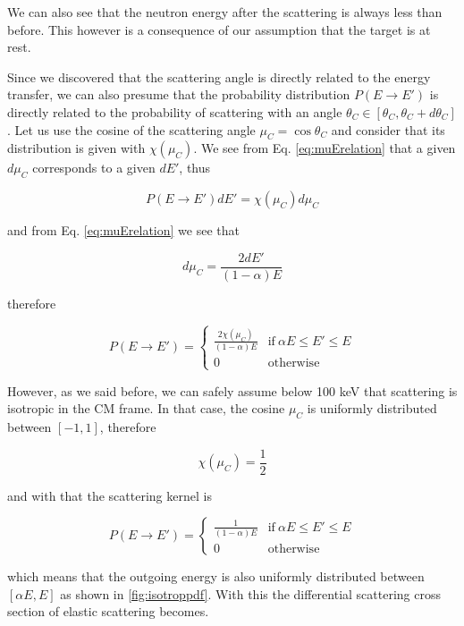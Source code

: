 We can also see that the neutron energy after the scattering is always less than before. This however is a consequence of our assumption that the target is at rest.

Since we discovered that the scattering angle is directly related to the energy transfer, we can also presume that the probability distribution $P(E\rightarrow E')$ is directly related to the probability of scattering with an angle $\theta_C \in [\theta_C,\theta_C+d\theta_C]$. Let us use the cosine of the scattering angle $\mu_C=\cos\theta_C$ and consider that its distribution is given with $\chi(\mu_C)$. We see from Eq. \eqref{eq:muErelation} that a given $d\mu_C$ corresponds to a given $dE'$, thus 

$$P(E\rightarrow E')dE'=\chi(\mu_C)d\mu_C$$

\noindent and from  Eq. \eqref{eq:muErelation} we see that

$$d\mu_C=\frac{2dE'}{(1-\alpha)E}$$

\noindent therefore

\begin{equation}
    P(E\rightarrow E') = 
    \begin{cases}
      \frac{2\chi(\mu_C)}{(1-\alpha)E} & \text{if} \: \alpha E \leq E' \leq E \\
      0 & \text{otherwise}
    \end{cases}
\end{equation}

However, as we said before, we can safely assume below 100 keV that scattering is isotropic in the CM frame. In that case, the cosine $\mu_C$ is uniformly distributed between $[-1,1]$, therefore

$$\chi(\mu_C)=\frac{1}{2}$$

\noindent and with that the scattering kernel is

\begin{equation}
    P(E\rightarrow E') = 
    \begin{cases}
      \frac{1}{(1-\alpha)E} & \text{if} \: \alpha E \leq E' \leq E \\
      0 & \text{otherwise}
    \end{cases}
\end{equation}

\noindent which means that the outgoing energy is also uniformly distributed between $[\alpha E, E]$ as shown in \autoref{fig:isotroppdf}. With this the differential scattering cross section of elastic scattering becomes.

